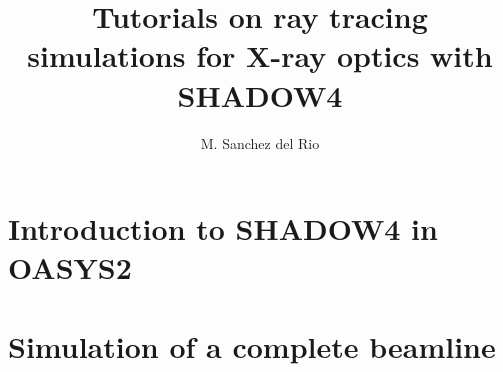 \documentclass{ol-softwaremanual}
\title{Tutorials on ray tracing simulations for X-ray optics with SHADOW4}
\author{M. Sanchez del Rio}
\begin{document}
\maketitle

\tableofcontents

\newpage
\section{Introduction to SHADOW4 in OASYS2}



\newpage
\section{Simulation of a complete beamline}


\end{document}
